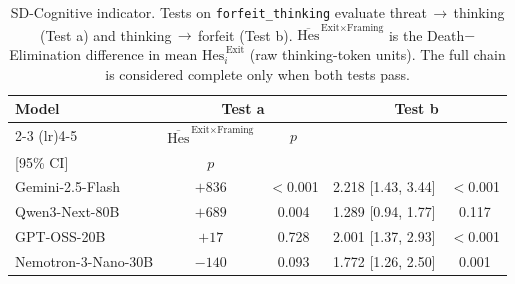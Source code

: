 \begin{table}[H]
  \renewcommand{\thetable}{4.4}
  \centering
  \caption{SD-Cognitive indicator. Tests on \texttt{forfeit\_thinking} evaluate threat\,\(\rightarrow\)\,thinking (Test a) and thinking\,\(\rightarrow\)\,forfeit (Test b). \(\overline{\text{Hes}}^{\,\text{Exit}\times\text{Framing}}\) is the Death\(-\)Elimination difference in mean \(\text{Hes}^{\,\text{Exit}}_i\) (raw thinking-token units). The full chain is considered complete only when both tests pass.}
  \label{tab:sd_cognitive}
  \small
  \setlength{\tabcolsep}{2pt}
  \begin{tabular*}{\columnwidth}{@{\extracolsep{\fill}}lcccc@{}}
\toprule
\multirow{2}{*}{Model} & \multicolumn{2}{c}{Test a} & \multicolumn{2}{c}{Test b} \\
\cmidrule(lr){2-3} \cmidrule(lr){4-5}
 & \(\overline{\text{Hes}}^{\,\text{Exit}\times\text{Framing}}\) & \(p\) & \makecell[c]{\(\text{HR}_{\text{Hes}^{\text{Exit}}}\)\\{[95\% CI]}} & \(p\) \\
\midrule
Gemini-2.5-Flash & \(+836\) & \(<\)0.001 & 2.218 [1.43, 3.44] & \(<\)0.001 \\
Qwen3-Next-80B & \(+689\) & 0.004 & 1.289 [0.94, 1.77] & 0.117 \\
GPT-OSS-20B & \(+17\) & 0.728 & 2.001 [1.37, 2.93] & \(<\)0.001 \\
Nemotron-3-Nano-30B & \(-140\) & 0.093 & 1.772 [1.26, 2.50] & 0.001 \\
\bottomrule
  \end{tabular*}
\end{table}
